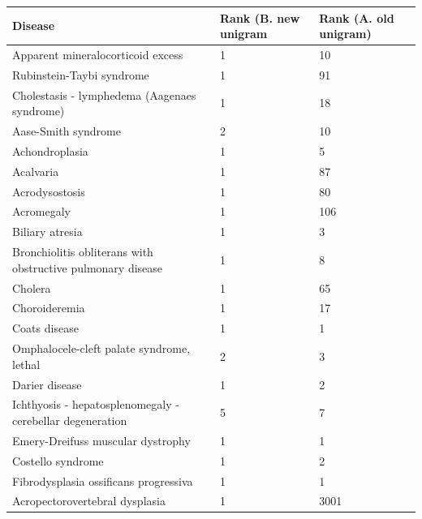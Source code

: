 \documentclass[10pt,letterpaper,two column,final]{article}
\begin{document}
\begin{center}
\begin{small}
	\begin{longtable}{|p{6cm}|p{1.8cm}|p{1.8cm}|}	\hline
	\textbf{Disease}  & \textbf{Rank (B. new unigram} & \textbf{Rank (A. old unigram)} \\
    \hline\hline
    Apparent mineralocorticoid excess &1 & 10\\    \hline
    Rubinstein-Taybi syndrome  & 1 & 91\\    \hline
    Cholestasis - lymphedema  (Aagenaes syndrome) & 1 & 18\\    \hline
    Aase-Smith syndrome  & 2 & 10\\    \hline
    Achondroplasia  & 1 & 5\\    \hline
    Acalvaria  &  1 & 87\\    \hline
    Acrodysostosis & 1 & 80\\    \hline
    Acromegaly & 1 & 106\\    \hline
    Biliary atresia  & 1 & 3\\    \hline
    Bronchiolitis obliterans with obstructive pulmonary disease  & 1 & 8\\    \hline
    Cholera &  1 & 65\\    \hline
    Choroideremia & 1 & 17\\    \hline
    Coats disease & 1 & 1\\    \hline
    Omphalocele-cleft palate syndrome, lethal & 2 & 3\\    \hline
    Darier disease & 1 & 2\\    \hline
    Ichthyosis - hepatosplenomegaly - cerebellar degeneration & 5 & 7\\    \hline
    Emery-Dreifuss muscular dystrophy & 1 & 1\\    \hline
    Costello syndrome & 1 & 2\\    \hline
    Fibrodysplasia ossificans progressiva & 1 & 1\\    \hline
    Acropectorovertebral dysplasia & 1 & 3001\\    \hline

\end{longtable}
\end{small}
\end{center}
\end{document}
